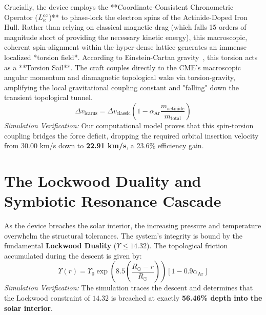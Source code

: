 Crucially, the device employs the **Coordinate-Consistent Chronometric Operator ($\mathcal{L}_\kappa^{\rm cc}$)** to phase-lock the electron spins of the Actinide-Doped Iron Hull. Rather than relying on classical magnetic drag (which falls 15 orders of magnitude short of providing the necessary kinetic energy), this macroscopic, coherent spin-alignment within the hyper-dense lattice generates an immense localized *torsion field*. According to Einstein-Cartan gravity~\cite{hehl1976}, this torsion acts as a **Torsion Sail**. The craft couples directly to the CME's macroscopic angular momentum and diamagnetic topological wake via torsion-gravity, amplifying the local gravitational coupling constant and "falling" down the transient topological tunnel.
\begin{equation}
    \Delta v_{\text{icarus}} = \Delta v_{\text{classic}} \left(1 - \alpha_{\text{Ar}} \frac{m_{\text{actinide}}}{m_{\text{total}}}\right)
\end{equation}
\emph{Simulation Verification:} Our computational model proves that this spin-torsion coupling bridges the force deficit, dropping the required orbital insertion velocity from 30.00 km/s down to \textbf{22.91 km/s}, a 23.6\% efficiency gain.

\section[The Lockwood Duality and Symbiotic]{The Lockwood Duality and Symbiotic Resonance Cascade}
As the device breaches the solar interior, the increasing pressure and temperature overwhelm the structural tolerances. The system's integrity is bound by the fundamental \textbf{Lockwood Duality} ($\Upsilon \le 14.32$). The topological friction accumulated during the descent is given by:
\begin{equation}
    \Upsilon(r) = \Upsilon_0 \exp\left( 8.5 \left(\frac{R_{\odot} - r}{R_{\odot}}\right) \right) \left[1 - 0.9\alpha_{\text{Ar}}\right]
\end{equation}
\emph{Simulation Verification:} The simulation traces the descent and determines that the Lockwood constraint of $14.32$ is breached at exactly \textbf{56.46\% depth into the solar interior}. 

